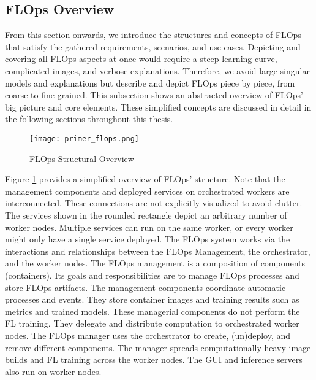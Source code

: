 \subsection{FLOps Overview}

From this section onwards, we introduce the structures and concepts of FLOps that satisfy the gathered requirements, scenarios, and use cases.
Depicting and covering all FLOps aspects at once would require a steep learning curve, complicated images, and verbose explanations.
Therefore, we avoid large singular models and explanations but describe and depict FLOps piece by piece, from coarse to fine-grained.
This subsection shows an abstracted overview of FLOps' big picture and core elements.
These simplified concepts are discussed in detail in the following sections throughout this thesis.

\begin{figure}[H]
    \begin{adjustwidth}{-0.1\paperwidth}{-0.1\paperwidth}
        \centering
        \texttt{[image: primer\_flops.png]}
        \caption{FLOps Structural Overview}
        \label{fig:flops_structure_overview}
    \end{adjustwidth}
\end{figure}

Figure \ref{fig:flops_structure_overview} provides a simplified overview of FLOps' structure.
Note that the management components and deployed services on orchestrated workers are interconnected.
These connections are not explicitly visualized to avoid clutter.
The services shown in the rounded rectangle depict an arbitrary number of worker nodes.
Multiple services can run on the same worker, or every worker might only have a single service deployed.
The FLOps system works via the interactions and relationships between the FLOps Management, the orchestrator, and the worker nodes.
The FLOps management is a composition of components (containers).
Its goals and responsibilities are to manage FLOps processes and store FLOps artifacts.
The management components coordinate automatic processes and events.
They store container images and training results such as metrics and trained models.
These managerial components do not perform the FL training.
They delegate and distribute computation to orchestrated worker nodes.
The FLOps manager uses the orchestrator to create, (un)deploy, and remove different components.
The manager spreads computationally heavy image builds and FL training across the worker nodes.
The GUI and inference servers also run on worker nodes.


